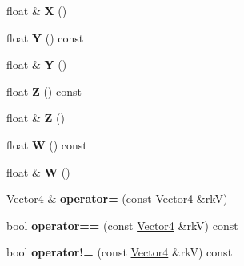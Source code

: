 \begin{DoxyCompactItemize}
\item 
float \& {\bfseries X} ()\hypertarget{class_magnum_1_1_vector4_abd0aa71ffae038f665acb7d77ea5f96f}{}\label{class_magnum_1_1_vector4_abd0aa71ffae038f665acb7d77ea5f96f}

\item 
float {\bfseries Y} () const \hypertarget{class_magnum_1_1_vector4_a8ca461ac40fe897126faa56792a1e054}{}\label{class_magnum_1_1_vector4_a8ca461ac40fe897126faa56792a1e054}

\item 
float \& {\bfseries Y} ()\hypertarget{class_magnum_1_1_vector4_a6fd27a7b4642e30b6244c8d34ee89adf}{}\label{class_magnum_1_1_vector4_a6fd27a7b4642e30b6244c8d34ee89adf}

\item 
float {\bfseries Z} () const \hypertarget{class_magnum_1_1_vector4_a485a4d7afd466fb6b3b88542904f20ba}{}\label{class_magnum_1_1_vector4_a485a4d7afd466fb6b3b88542904f20ba}

\item 
float \& {\bfseries Z} ()\hypertarget{class_magnum_1_1_vector4_abac0b039d66598b528daaafe6f4a8489}{}\label{class_magnum_1_1_vector4_abac0b039d66598b528daaafe6f4a8489}

\item 
float {\bfseries W} () const \hypertarget{class_magnum_1_1_vector4_ae1cdffbbfb2d1d9ff3f20cd174d23355}{}\label{class_magnum_1_1_vector4_ae1cdffbbfb2d1d9ff3f20cd174d23355}

\item 
float \& {\bfseries W} ()\hypertarget{class_magnum_1_1_vector4_a966abe85b9f1820749d760ae24753f50}{}\label{class_magnum_1_1_vector4_a966abe85b9f1820749d760ae24753f50}

\item 
\hyperlink{class_magnum_1_1_vector4}{Vector4} \& {\bfseries operator=} (const \hyperlink{class_magnum_1_1_vector4}{Vector4} \&rkV)\hypertarget{class_magnum_1_1_vector4_a907b0e050e71493a74708c0dd434a211}{}\label{class_magnum_1_1_vector4_a907b0e050e71493a74708c0dd434a211}

\item 
bool {\bfseries operator==} (const \hyperlink{class_magnum_1_1_vector4}{Vector4} \&rkV) const \hypertarget{class_magnum_1_1_vector4_aa352a2de2353140fd88f0df0a8206767}{}\label{class_magnum_1_1_vector4_aa352a2de2353140fd88f0df0a8206767}

\item 
bool {\bfseries operator!=} (const \hyperlink{class_magnum_1_1_vector4}{Vector4} \&rkV) const \hypertarget{class_magnum_1_1_vector4_a0dabcb5743ce49dc23aa35e99f6ec2c7}{}\label{class_magnum_1_1_vector4_a0dabcb5743ce49dc23aa35e99f6ec2c7}


\end{DoxyCompactItemize}

